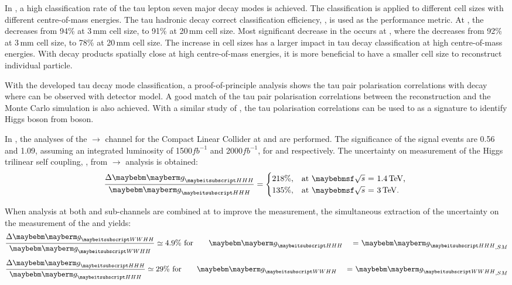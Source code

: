 In , a high classification rate of the tau lepton seven major decay modes is achieved. The classification is applied to different \ECAL cell sizes with different centre-of-mass energies. The tau hadronic decay correct classification efficiency, \tauHad,  is used as the performance metric. At , the \tauHad decreases from 94\% at 3\,mm cell size, to 91\% at 20\,mm cell size. Most significant decrease in the \tauHad occurs at  , where the \tauHad decreases from 92\% at 3\,mm cell size, to 78\% at 20\,mm cell size. The increase in \ECAL cell sizes has a larger impact in tau decay classification at high centre-of-mass energies. With decay products spatially close at high centre-of-mass energies, it is more beneficial to have a smaller \ECAL cell size to reconstruct individual particle.

With the developed tau decay mode classification, a proof-of-principle analysis shows the tau pair polarisation correlations with \ZToTauTau decay where \tauToPion can be observed with \ILD detector model. A good match of the tau pair polarisation correlations between the reconstruction and the Monte Carlo simulation is also achieved.   With a similar study of \HiggsToTauTau,  the tau polarisation correlations can be used to as a signature to identify  Higgs boson from \PZ boson.




 In , the analyses of the \eeToHH $\to$ \HepProcess{ \Pbottom \APbottom \PWplus \PWminus \Pnue \APnue} channel for the Compact Linear Collider at  and  are performed. The significance of the signal events are 0.56 and 1.09,  assuming an integrated luminosity of 1500$fb^{-1}$ and 2000$fb^{-1}$, for   and  respectively.  The uncertainty on measurement of the Higgs trilinear self coupling, \gHHH, from  \eeToHH $\to$ \HepProcess{ \Pbottom \APbottom \PWplus \PWminus \Pnue \APnue} analysis is obtained:
\begin{equation}
\frac{\Delta\gHHH}{\gHHH}=
\begin{cases}
  218\%, & \mbox{at \rootS{1.4}, }  \\
  135\%, & \mbox{at \rootS{3}}.
\end{cases}
\end{equation}

When analysis at both \eeToHHbbWW and \eeToHHbbbb sub-channels are combined at  to improve the measurement, the simultaneous extraction of the uncertainty on the measurement of the \gHHH and \gWWHH yields:
\begin{equation}
\frac{\Delta\gWWHH}{\gWWHH} \simeq 4.9\% \text{ for \gHHH = $\gHHH_{,SM}$}
\end{equation}
\begin{equation}
\frac{\Delta\gHHH}{\gHHH} \simeq 29\% \text{ for \gWWHH = $\gWWHH_{,SM}$}
\end{equation}
